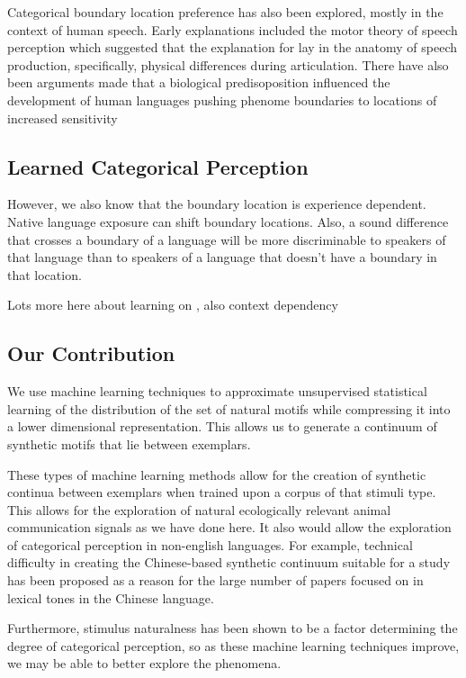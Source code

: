 Categorical boundary location preference has also been explored, mostly in the context of human speech. Early explanations included the motor theory of speech perception which suggested that the explanation for \CP lay in the anatomy of speech production, specifically, physical differences during articulation\cite{liberman1967perception}. There have also been arguments made that a biological predisoposition influenced the development of human languages pushing phenome boundaries to locations of increased sensitivity\cite{stevens1981constraints, goldstone2010categorical, halle1979some}

\subsection{Learned Categorical Perception}

However, we also know that the boundary location is experience dependent. Native language exposure can shift boundary locations. Also, a sound difference that crosses a boundary of a language will be more discriminable to speakers of that language than to speakers of a language that doesn’t have a boundary in that location.

Lots more here about learning on \CP, also context dependency

\subsection{Our Contribution}
We use machine learning techniques to approximate unsupervised statistical learning of the distribution of the set of natural motifs while compressing it into a lower dimensional representation. This allows us to generate a continuum of synthetic motifs that lie between exemplars.

These types of machine learning methods allow for the creation of synthetic continua between exemplars when trained upon a corpus of that stimuli type. This allows for the exploration of natural ecologically relevant animal communication signals as we have done here. It also would allow the exploration of categorical perception in non-english languages. For example, technical difficulty in creating the Chinese-based synthetic continuum suitable for a \CP study has been proposed as a reason for the large number of papers focused on \CP in lexical tones in the Chinese language\cite{zhang2013categorical}.

Furthermore, stimulus naturalness has been shown to be a factor determining the degree of categorical perception, so as these machine learning techniques improve, we may be able to better explore the \CP phenomena.

